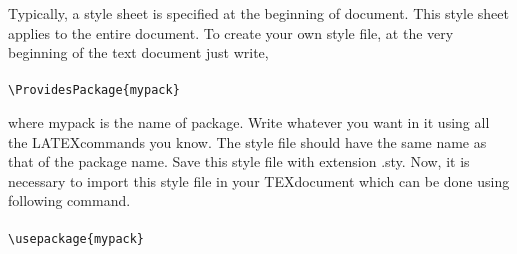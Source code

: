 Typically, a style sheet is specified at the beginning of document. This style sheet applies to the entire document. To create your own style file, at the very beginning of the text document just write,\\ 
\\
\verb|\ProvidesPackage{mypack}|\\

\par where mypack is the name of package. Write whatever you want in it using all the LATEXcommands you know. The style file should have the same name as that of the package name. Save this style file with extension .sty. Now, it is necessary to import this style file in your TEXdocument which can be done using following command. \\
\\
\verb|\usepackage{mypack}|\\